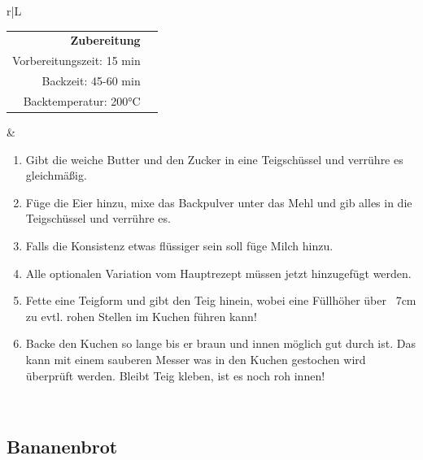 \documentclass[a4paper, 12pt]{scrbook} 								%
\numberwithin{equation}{section} 									%
\begin{document}
		\begin{tabularx}{\textwidth}{r|L}
									

			\begin{tabular}[t]{rr}
				\textbf{Zubereitung}	\\
				Vorbereitungszeit: 15 min	\\
				Backzeit:	45-60 min		\\
				Backtemperatur: 200°C \\
			\end{tabular}			&	\begin{enumerate}[]
											\item Gibt die weiche Butter und den Zucker in eine Teigschüssel und verrühre es gleichmäßig.
											\item Füge die Eier hinzu, mixe das Backpulver unter das Mehl und gib alles in die Teigschüssel und verrühre es.
											\item Falls die Konsistenz etwas flüssiger sein soll füge Milch hinzu.
											\item Alle optionalen Variation vom Hauptrezept müssen jetzt hinzugefügt werden.
											\item Fette eine Teigform und gibt den Teig hinein, wobei eine Füllhöher über ~7cm zu evtl. rohen Stellen im Kuchen führen kann!
											\item Backe den Kuchen so lange bis er braun und innen möglich gut durch ist. Das kann mit einem sauberen Messer was in den Kuchen gestochen wird überprüft werden. Bleibt Teig kleben, ist es noch roh innen!
										\end{enumerate}	\\
		\end{tabularx}
		\newpage



		\subsection{Bananenbrot}	\label{bananenbrot}
\end{document}
